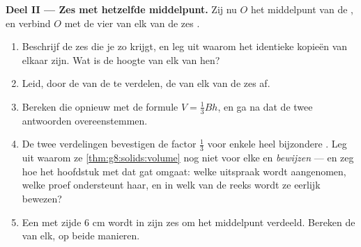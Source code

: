 \begin{problem}
\medskip
\noindent\textbf{Deel II --- Zes  met hetzelfde middelpunt.}
Zij nu $O$ het middelpunt van de , en verbind $O$ met de vier  van
elk van de zes .
\begin{enumerate}[resume]
  \item Beschrijf de zes  die je zo krijgt, en leg uit waarom het
        identieke kopieën van elkaar zijn. Wat is de hoogte van elk van hen?
  \item Leid, door de  van de  te verdelen, de  van elk van de
        zes  af.
  \item Bereken die  opnieuw met de formule $V = \frac13 B h$, en ga na dat
        de twee antwoorden overeenstemmen.
  \item De twee verdelingen bevestigen de factor $\frac13$ voor enkele heel
        bijzondere . Leg uit waarom ze \cref{thm:g8:solids:volume} nog
        niet voor elke  en  \emph{bewijzen} --- en zeg hoe het
        hoofdstuk met dat gat omgaat: welke uitspraak wordt aangenomen, welke
        proef ondersteunt haar, en in welk  van de reeks wordt ze eerlijk
        bewezen?
  \item Een  met zijde $6$ cm wordt in zijn zes  om het middelpunt
        verdeeld. Bereken de  van elk, op beide manieren.
\end{enumerate}


\end{problem}

